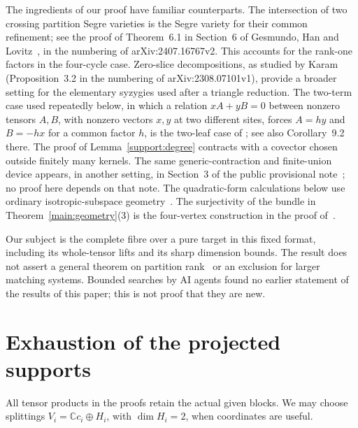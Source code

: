 \documentclass[11pt,letterpaper]{article}
\newcommand{\C}{\mathbb C}
\theoremstyle{definition}
\begin{document}
The ingredients of our proof have familiar counterparts. The intersection of
two crossing partition Segre varieties is the Segre variety for their common
refinement; see the proof of Theorem~6.1 in Section~6 of Gesmundo, Han and
Lovitz~\cite{ghl}, in the numbering of arXiv:2407.16767v2. This accounts
for the rank-one factors in the four-cycle case. Zero-slice decompositions,
as studied by Karam~\cite{karam} (Proposition~3.2 in the numbering of
arXiv:2308.07101v1), provide a broader setting for the elementary syzygies
used after a triangle reduction. The two-term case used repeatedly below,
in which a relation \(xA+yB=0\) between nonzero tensors \(A,B\), with
nonzero vectors \(x,y\) at two different sites, forces \(A=hy\) and
\(B=-hx\) for a common factor \(h\), is the two-leaf case of
\cite[Theorem~2.1]{ign-relations}; see also Corollary~9.2 there.
The proof of Lemma~\ref{support:degree} contracts with a covector chosen
outside finitely many kernels. The same generic-contraction and
finite-union device appears, in another setting, in Section~3 of the
public provisional note~\cite{axis}; no proof here depends on that note.
The quadratic-form calculations below use ordinary isotropic-subspace
geometry~\cite{ekm}. The surjectivity of the bundle in
Theorem~\ref{main:geometry}(3) is the four-vertex construction in the
proof of~\cite[Proposition~7.1]{ign-geometry}.

Our subject is the complete fibre over a pure target in this fixed format,
including its whole-tensor lifts and its sharp dimension bounds. The result
does not assert a general theorem on partition rank~\cite{naslund} or an
exclusion for larger matching systems.
Bounded searches by AI agents found no earlier statement of the results
of this paper; this is not proof that they are new.

\section{Exhaustion of the projected supports}

All tensor products in the proofs retain the actual given blocks. We may
choose splittings \(V_i=\C c_i\oplus H_i\), with \(\dim H_i=2\), when
coordinates are useful.
\end{document}
